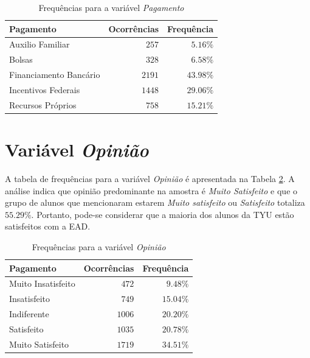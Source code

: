 \documentclass[10pt,a4paper,oneside]{article}
\begin{document}
\begin{table}[h]
\footnotesize
\centering
\caption{Frequências para a variável \textit{Pagamento}}
\label{table: frequencias pagamento}
\vspace{0.5em}
\begin{tabular}{l r r}
	\toprule
	\textbf{Pagamento}     & \textbf{Ocorrências} & \textbf{Frequência} \\
	\midrule
	Auxilio Familiar       & $257$                & $5.16\%$            \\
	Bolsas                 & $328$                & $6.58\%$            \\
	Financiamento Bancário & $2191$               & $43.98\%$           \\
	Incentivos Federais    & $1448$               & $29.06\%$           \\
	Recursos Próprios      & $758$                & $15.21\%$           \\
	\bottomrule
\end{tabular}
\end{table}

\clearpage
\section{Variável \textit{Opinião}}
\label{section:opiniao}

A tabela de frequências para a variável \textit{Opinião} é apresentada na Tabela \ref{table: frequencias opiniao}. A análise indica que opinião predominante na amostra é \textit{Muito Satisfeito} e que o grupo de alunos que mencionaram estarem \textit{Muito satisfeito} ou \textit{Satisfeito} totaliza $55.29\%$. Portanto, pode-se considerar que a maioria dos alunos da TYU estão satisfeitos com a EAD.

\begin{table}[h]
\footnotesize
\centering
\caption{Frequências para a variável \textit{Opinião}}
\label{table: frequencias opiniao}
\vspace{0.5em}
\begin{tabular}{l r r}
	\toprule
	\textbf{Pagamento}     & \textbf{Ocorrências} & \textbf{Frequência} \\
	\midrule
	Muito Insatisfeito     & $472$                & $9.48\%$            \\
	Insatisfeito           & $749$                & $15.04\%$           \\
	Indiferente            & $1006$               & $20.20\%$           \\
	Satisfeito             & $1035$               & $20.78\%$           \\
	Muito Satisfeito       & $1719$               & $34.51\%$           \\
	\bottomrule
\end{tabular}
\end{table}
\end{document}

